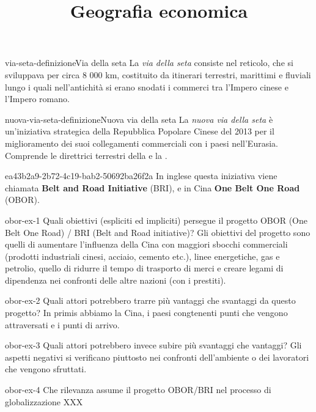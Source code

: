 \documentclass[preview]{standalone}
\begin{document}
\title{Geografia economica}
\genpage

\begin{snippetdefinition}{via-seta-definizione}{Via della seta}
    La \textit{via della seta} consiste nel reticolo, che si sviluppava per circa 8 000 km,
    costituito da itinerari terrestri, marittimi e fluviali lungo i quali nell'antichità si
    erano snodati i commerci tra l'Impero cinese e l'Impero romano.
\end{snippetdefinition}

\begin{snippetdefinition}{nuova-via-seta-definizione}{Nuova via della seta}
    La \textit{nuova via della seta} è un'iniziativa strategica della Repubblica
    Popolare Cinese del 2013 per il miglioramento dei suoi collegamenti commerciali con
    i paesi nell'Eurasia. Comprende le direttrici terrestri della 
    e la .
\end{snippetdefinition}

\begin{snippet}{ea43b2a9-2b72-4c19-bab2-50692ba26f2a}
    In inglese questa iniziativa viene chiamata \textbf{Belt and Road Initiative} (BRI),
e in Cina \textbf{One Belt One Road} (OBOR).
\end{snippet}

\begin{snippetexercise}{obor-ex-1}
    {Quali obiettivi (espliciti ed impliciti) persegue il progetto OBOR (One Belt One Road) / BRI (Belt and Road initiative)?}
    Gli obiettivi del progetto sono quelli di aumentare l'influenza della Cina
    con maggiori sbocchi commerciali (prodotti industriali cinesi, acciaio, cemento etc.),
    linee energetiche, gas e petrolio, quello di ridurre il tempo di trasporto di merci
    e creare legami di dipendenza nei confronti delle altre nazioni (con i prestiti).
\end{snippetexercise}

\begin{snippetexercise}{obor-ex-2}
    {Quali attori potrebbero trarre più vantaggi che svantaggi da questo progetto?}
    In primis abbiamo la Cina, i paesi congtenenti punti che vengono attraversati
    e i punti di arrivo.
\end{snippetexercise}

\begin{snippetexercise}{obor-ex-3}
    {Quali attori potrebbero invece subire più svantaggi che vantaggi?}
    Gli aspetti negativi si verificano piuttosto nei confronti dell'ambiente o
    dei lavoratori che vengono sfruttati.
\end{snippetexercise}

\begin{snippetexercise}{obor-ex-4}
    {Che rilevanza assume il progetto OBOR/BRI nel processo di globalizzazione}
    XXX
\end{snippetexercise}
\end{document}
